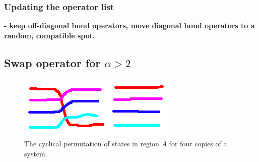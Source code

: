 \documentclass[prb,aps,twocolumn,floatfix,amsmath,amssymb,superscriptaddress,tightenlines]{revtex4}
\begin{document}
\subsubsection{Updating the operator list}
\noindent
{\bf- keep off-diagonal bond operators, move diagonal bond operators to a random, compatible spot.}
	
\subsection{Swap operator for $\alpha > 2$}

\begin{figure} {
\includegraphics[width=2.4 in]{swap.png} \caption{ 
\label{swap_4} 
The cyclical permutation of states in region $A$ for four copies of a system.
}
} \end{figure}


\end{document}
